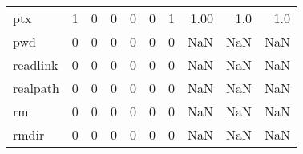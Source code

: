 \begin{longtable}{lrrrrrrrrr}
ptx       &                                       1 &                                                  0 &                                                  0 &                                                  0 &                                                  0 &                                                  1 &                                               1.00 &                                    1.0 &                                  1.0 \\
pwd       &                                       0 &                                                  0 &                                                  0 &                                                  0 &                                                  0 &                                                  0 &                                                NaN &                                    NaN &                                  NaN \\
readlink  &                                       0 &                                                  0 &                                                  0 &                                                  0 &                                                  0 &                                                  0 &                                                NaN &                                    NaN &                                  NaN \\
realpath  &                                       0 &                                                  0 &                                                  0 &                                                  0 &                                                  0 &                                                  0 &                                                NaN &                                    NaN &                                  NaN \\
rm        &                                       0 &                                                  0 &                                                  0 &                                                  0 &                                                  0 &                                                  0 &                                                NaN &                                    NaN &                                  NaN \\
rmdir     &                                       0 &                                                  0 &                                                  0 &                                                  0 &                                                  0 &                                                  0 &                                                NaN &                                    NaN &                                  NaN \\

\end{longtable}
